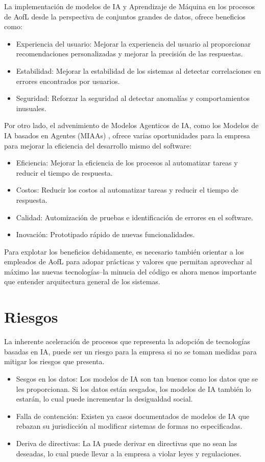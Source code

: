 \documentclass[conference]{IEEEtran}
\begin{document}
La implementación de modelos de IA y Aprendizaje de Máquina en los procesos de AofL desde la perspectiva de conjuntos grandes de datos, ofrece beneficios como:
\begin{itemize}
    \item Experiencia del usuario: Mejorar la experiencia del usuario al proporcionar recomendaciones personalizadas y mejorar la precisión de las respuestas.
    \item Estabilidad: Mejorar la estabilidad de los sistemas al detectar correlaciones en errores encontrados por usuarios.
    \item Seguridad: Reforzar la seguridad al detectar anomalías y comportamientos inusuales.
\end{itemize}
Por otro lado, el advenimiento de Modelos Agenticos de IA, como los Modelos de IA basados en Agentes (MIAAs) \cite{cowell2025agentic}, ofrece varias oportunidades para la empresa para mejorar la eficiencia del desarrollo mismo del software:
\begin{itemize}
    \item Eficiencia: Mejorar la eficiencia de los procesos al automatizar tareas y reducir el tiempo de respuesta.
    \item Costos: Reducir los costos al automatizar tareas y reducir el tiempo de respuesta.
    \item Calidad: Automización de pruebas e identificación de errores en el software.
    \item Inovación: Prototipado rápido de nuevas funcionalidades.
\end{itemize}
Para explotar los beneficios debidamente, es necesario también orientar a los empleados de AofL para adopar prácticas y valores que permitan aprovechar al máximo las nuevas tecnologías--la minucia del código es ahora menos importante que entender arquitectura general de los sistemas.
\section{Riesgos}
La inherente aceleración de procesos que representa la adopción de tecnologías basadas en IA, puede ser un riesgo para la empresa si no se toman medidas para mitigar los riesgos que presenta.
\begin{itemize}
    \item Sesgos en los datos: Los modelos de IA son tan buenos como los datos que se les proporcionan. Si los datos están sesgados, los modelos de IA también lo estarán, lo cual puede incrementar la desigualdad social.
    \item Falla de contención: Existen ya casos documentados de modelos de IA que rebazan su jurisdicción al modificar sistemas de formas no especificadas.
    \item Deriva de directivas: La IA puede derivar en directivas que no sean las deseadas, lo cual puede llevar a la empresa a violar leyes y regulaciones.
\end{itemize}
\end{document}
